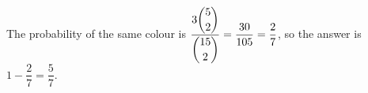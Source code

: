 The probability of the same colour is $\dfrac{3\dbinom52}{\dbinom{15}2}=\dfrac{30}{105}=\dfrac27$, so the answer is $1-\dfrac27=\boxed{\dfrac57}$.
